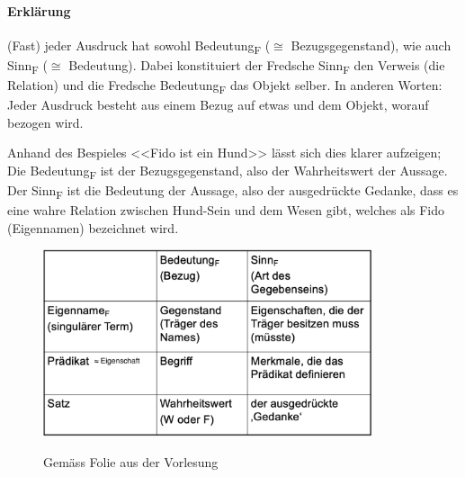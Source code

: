 \documentclass[../main.tex]{subfiles}
\begin{document}
\paragraph{Erklärung} (Fast) jeder Ausdruck hat sowohl Bedeutung\textsubscript{F} ($\cong$ Bezugsgegenstand), wie auch Sinn\textsubscript{F} ($\cong$ Bedeutung). Dabei konstituiert der Fredsche Sinn\textsubscript{F} den Verweis (die Relation) und die Fredsche Bedeutung\textsubscript{F} das Objekt selber. In anderen Worten: Jeder Ausdruck besteht aus einem Bezug auf etwas und dem Objekt, worauf bezogen wird. 

Anhand des Bespieles <<Fido ist ein Hund>> lässt sich dies klarer aufzeigen; Die Bedeutung\textsubscript{F} ist der Bezugsgegenstand, also der Wahrheitswert der Aussage. Der Sinn\textsubscript{F} ist die Bedeutung der Aussage, also der ausgedrückte Gedanke, dass es eine wahre Relation zwischen Hund-Sein und dem Wesen gibt, welches als Fido (Eigennamen) bezeichnet wird.

\vspace{10pt} 

\begin{figure}[!htb]
\centering
{\centering\includegraphics[height=5.5cm]{images/freges_sinn_und_bedeutung.png}\endcenter}
\caption{Gemäss Folie aus der Vorlesung}
\end{figure}
\end{document}
